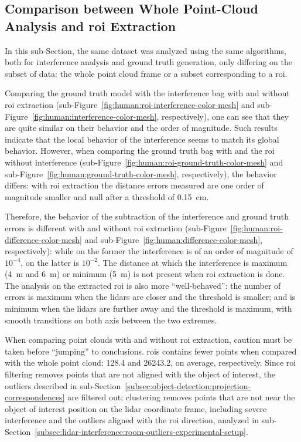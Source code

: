\subsection{Comparison between Whole Point-Cloud Analysis and \acs{roi} Extraction}
In this sub-Section, the same dataset was analyzed using the same algorithms, both for interference analysis and ground truth generation, only differing on the subset of data: the whole point cloud frame or a subset corresponding to a \ac{roi}.

Comparing the ground truth model with the interference bag with and without \ac{roi} extraction (sub-Figure~\ref{fig:human:roi-interference-color-mesh} and sub-Figure~\ref{fig:human:interference-color-mesh}, respectively), one can see that they are quite similar on their behavior and the order of magnitude. Such results indicate that the local behavior of the interference seems to match its global behavior. However, when comparing the ground truth bag with and the \ac{roi} without interference (sub-Figure~\ref{fig:human:roi-ground-truth-color-mesh} and sub-Figure~\ref{fig:human:ground-truth-color-mesh}, respectively), the behavior differs: with \ac{roi} extraction the distance errors measured are one order of magnitude smaller and null after a threshold of \SI{0.15}{\centi\meter}. 

Therefore, the behavior of the subtraction of the interference and ground truth errors is different with and without \ac{roi} extraction (sub-Figure~\ref{fig:human:roi-difference-color-mesh} and sub-Figure~\ref{fig:human:difference-color-mesh}, respectively): while on the former the interference is of an order of magnitude of $10^{-4}$, on the latter is $10^{-2}$. The distance at which the interference is maximum (\SI{4}{\meter} and \SI{6}{\meter}) or minimum (\SI{5}{\meter}) is not present when \ac{roi} extraction is done. The analysis on the extracted \ac{roi} is also more ``well-behaved'': the number of errors is maximum when the \acp{lidar} are closer and the threshold is smaller; and is minimum when the \acp{lidar} are further away and the threshold is maximum, with smooth transitions on both axis between the two extremes.

When comparing point clouds with and without \ac{roi} extraction, caution must be taken before  ``jumping'' to conclusions. \acp{roi} contains fewer points when compared with the whole point cloud: 128.4 and 26243.2, on average, respectively. Since \ac{roi} filtering removes points that are not aligned with the object of interest, the outliers described in sub-Section~\ref{subsec:object-detection:projection-correspondences} are filtered out; clustering removes points that are not near the object of interest position on the \ac{lidar} coordinate frame, including severe interference and the outliers aligned with the \ac{roi} direction, analyzed in sub-Section~\ref{subsec:lidar-interference:room-outliers-experimental-setup}.

